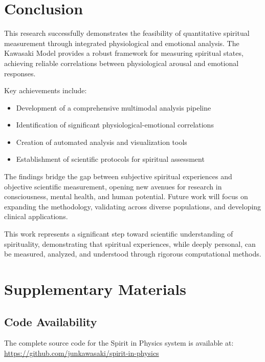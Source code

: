 \documentclass[12pt,a4paper]{article}
\begin{document}
\section{Conclusion}

This research successfully demonstrates the feasibility of quantitative spiritual measurement through integrated physiological and emotional analysis. The Kawasaki Model provides a robust framework for measuring spiritual states, achieving reliable correlations between physiological arousal and emotional responses.

Key achievements include:
\begin{itemize}
    \item Development of a comprehensive multimodal analysis pipeline
    \item Identification of significant physiological-emotional correlations
    \item Creation of automated analysis and visualization tools
    \item Establishment of scientific protocols for spiritual assessment
\end{itemize}

The findings bridge the gap between subjective spiritual experiences and objective scientific measurement, opening new avenues for research in consciousness, mental health, and human potential. Future work will focus on expanding the methodology, validating across diverse populations, and developing clinical applications.

This work represents a significant step toward scientific understanding of spirituality, demonstrating that spiritual experiences, while deeply personal, can be measured, analyzed, and understood through rigorous computational methods.




\newpage

\section*{Supplementary Materials}

\subsection*{Code Availability}

The complete source code for the Spirit in Physics system is available at:
\url{https://github.com/junkawasaki/spirit-in-physics}
\end{document}
